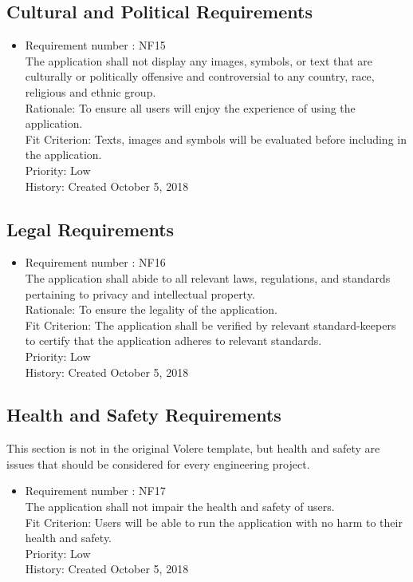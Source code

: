 \documentclass[12pt, titlepage]{article}
\begin{document}
\subsection{Cultural and Political Requirements}
\begin{itemize}
\item Requirement number : NF15\\
The application shall not display any images, symbols, or text that are culturally or politically offensive and controversial to any country, race, religious and ethnic group. \\
Rationale: To ensure all users will enjoy the experience of using the application. \\
Fit Criterion: Texts, images and symbols will be evaluated before including in  the application.   \\
Priority: Low\\
History: Created October 5, 2018

\end{itemize}
\subsection{Legal Requirements}
\begin{itemize}
\item Requirement number : NF16\\
The application shall abide to all relevant laws, regulations, and standards  pertaining to privacy and intellectual property.\\
Rationale: To ensure the legality of the application.\\
Fit Criterion:  The application shall be verified by relevant standard-keepers to certify that the application adheres to relevant standards.  \\
Priority: Low\\
History: Created October 5, 2018

\end{itemize}

\subsection{Health and Safety Requirements}

This section is not in the original Volere template, but health and safety are
issues that should be considered for every engineering project.
\begin{itemize}
\item Requirement number : NF17\\
The application shall not impair the health and safety of users.\\
Fit Criterion:  Users will be able to run the application with no harm to their health and safety. \\
Priority: Low\\
History: Created October 5, 2018

\end{itemize}
\end{document}
